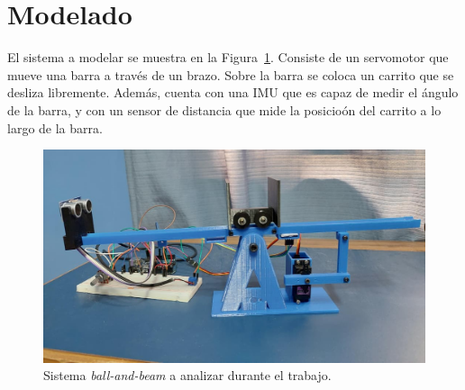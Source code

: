 \section{Modelado}

El sistema a modelar se muestra en la Figura~\ref{fig:planta}. Consiste de un servomotor que mueve una barra a través de un brazo. Sobre la barra se coloca un carrito que se desliza libremente. Además, cuenta con una IMU que es capaz de medir el ángulo de la barra, y con un sensor de distancia que mide la posicioón del carrito a lo largo de la barra.

\begin{figure}[!htbp]
    \centering
    \includegraphics[width=\linewidth]{img/planta.jpg}
    \caption{Sistema \emph{ball-and-beam} a analizar durante el trabajo.}
    \label{fig:planta}
\end{figure}

